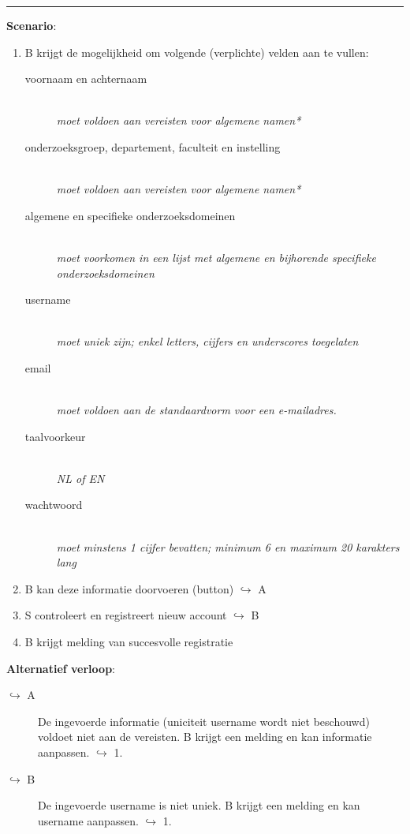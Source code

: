 \hrule
\vspace{2 mm}
\noindent \textbf{Scenario}:
\begin{enumerate}
\item B krijgt de mogelijkheid om volgende (verplichte) velden aan te vullen:
\begin{description}
  \item[voornaam en achternaam]  \hfill \\
  {\it moet voldoen aan vereisten voor algemene namen*}
  \item[onderzoeksgroep, departement, faculteit en instelling] \hfill \\
   {\it moet voldoen aan vereisten voor algemene namen*}
  \item[algemene en specifieke onderzoeksdomeinen] \hfill \\
  {\it moet voorkomen in een lijst met algemene en bijhorende specifieke onderzoeksdomeinen}
  \item[username] \hfill \\
    {\it moet uniek zijn; enkel letters, cijfers en underscores toegelaten}
    \item[email] \hfill \\
  {\it moet voldoen aan de standaardvorm voor een e-mailadres.}
       \item[taalvoorkeur] \hfill \\
   {\it NL of EN}
       \item[wachtwoord] \hfill \\
  {\it moet minstens 1 cijfer bevatten; minimum 6 en maximum 20 karakters lang}\\
\end{description}
  
 \item B kan deze informatie doorvoeren (button)  $\hookrightarrow$ A
 \item S controleert en registreert nieuw account  $\hookrightarrow$ B
 \item B krijgt melding van succesvolle registratie 
\end{enumerate}
\noindent \textbf{Alternatief verloop}:
\begin{description}
\item[ $\hookrightarrow$ A] De ingevoerde informatie (uniciteit username wordt niet beschouwd) voldoet niet aan de vereisten. B krijgt een melding en kan informatie aanpassen. $\hookrightarrow$ 1.
\item[ $\hookrightarrow$ B] De ingevoerde username is niet uniek. B krijgt een melding en kan username aanpassen. $\hookrightarrow$ 1.
\end{description}

